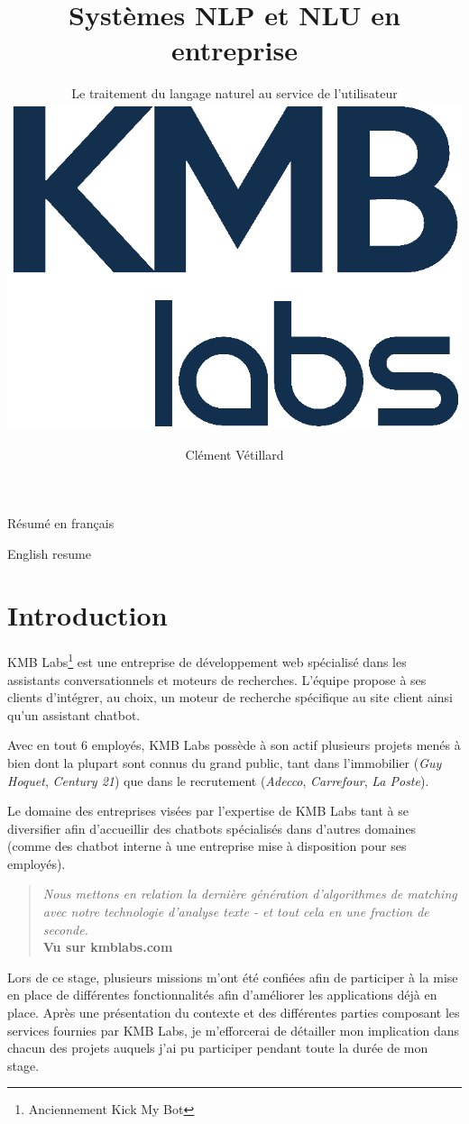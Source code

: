 \documentclass[12pt,a4paper,oneside]{scrreprt}
\title{Systèmes NLP et NLU en entreprise}
\subtitle{
Le traitement du langage naturel au service de l'utilisateur\\
	\vspace{0.3cm}
\includegraphics[scale=0.8]{pictures/kmb}
}
\author{Clément Vétillard}
\date{\vfill}
\newenvironment{abstractpage}
{\cleardoublepage\vspace*{\fill}\thispagestyle{empty}}
{\vfill\cleardoublepage}
\renewenvironment{abstract}[1]
{\bigskip\selectlanguage{#1}%
	\begin{center}\bfseries\abstractname\end{center}}
{\par\bigskip}
\begin{document}

\maketitle

\tableofcontents
\thispagestyle{empty}

\begin{abstractpage}
	\begin{abstract}{french}
		Résumé en français
	\end{abstract}

	\begin{abstract}{english}
		English resume
	\end{abstract}
\end{abstractpage}


\chapter*{Introduction}
KMB Labs\footnote{Anciennement Kick My Bot} est une entreprise de développement web spécialisé dans les assistants conversationnels et moteurs de recherches. L'équipe propose à ses clients d'intégrer, au choix, un moteur de recherche spécifique au site client ainsi qu'un assistant chatbot.

Avec en tout 6 employés, KMB Labs possède à son actif plusieurs projets menés à bien dont la plupart sont connus du grand public, tant dans l'immobilier (\textit{Guy Hoquet}, \textit{Century 21}) que dans le recrutement (\textit{Adecco}, \textit{Carrefour}, \textit{La Poste}).

Le domaine des entreprises visées par l'expertise de KMB Labs tant à se diversifier afin d'accueillir des chatbots spécialisés dans d'autres domaines (comme des chatbot interne à une entreprise mise à disposition pour ses employés).

\begin{quote}
	\og \textit{Nous mettons en relation la dernière génération d'algorithmes de matching avec notre technologie d'analyse texte - et tout cela en une fraction de seconde.}\fg{}\\
	\textbf{Vu sur kmblabs.com}
\end{quote}

Lors de ce stage, plusieurs missions m'ont été confiées afin de participer à la mise en place de différentes fonctionnalités afin d'améliorer les applications déjà en place. Après une présentation du contexte et des différentes parties composant les services fournies par KMB Labs, je m'efforcerai de détailler mon implication dans chacun des projets auquels j'ai pu participer pendant toute la durée de mon stage.
\end{document}
